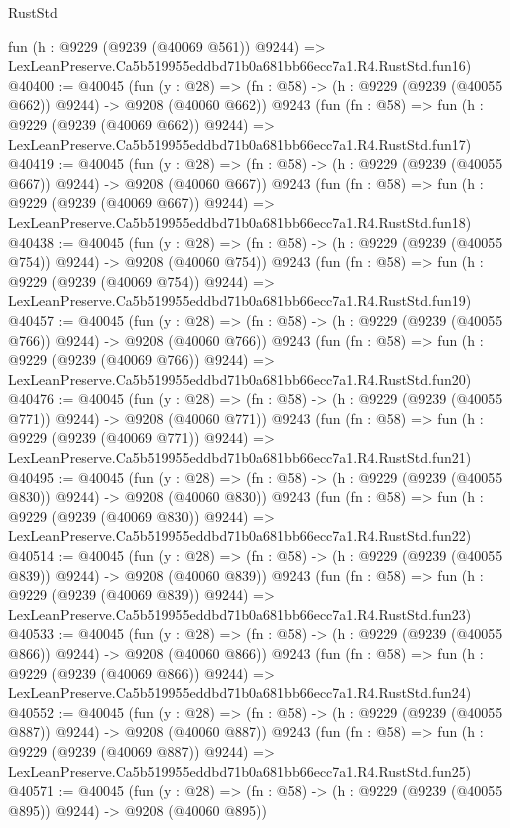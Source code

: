 \begin{lexlean}{RustStd}
\begin{coremodule}
    fun (h : @9229 (@9239 (@40069 @561)) @9244) =>
    LexLeanPreserve.Ca5b519955eddbd71b0a681bb66ecc7a1.R4.RustStd.fun16)
@40400 := @40045
    (fun (y : @28) => (fn : @58) -> (h : @9229 (@9239 (@40055 @662)) @9244) -> @9208 (@40060 @662))
    @9243
    (fun (fn : @58) =>
    fun (h : @9229 (@9239 (@40069 @662)) @9244) =>
    LexLeanPreserve.Ca5b519955eddbd71b0a681bb66ecc7a1.R4.RustStd.fun17)
@40419 := @40045
    (fun (y : @28) => (fn : @58) -> (h : @9229 (@9239 (@40055 @667)) @9244) -> @9208 (@40060 @667))
    @9243
    (fun (fn : @58) =>
    fun (h : @9229 (@9239 (@40069 @667)) @9244) =>
    LexLeanPreserve.Ca5b519955eddbd71b0a681bb66ecc7a1.R4.RustStd.fun18)
@40438 := @40045
    (fun (y : @28) => (fn : @58) -> (h : @9229 (@9239 (@40055 @754)) @9244) -> @9208 (@40060 @754))
    @9243
    (fun (fn : @58) =>
    fun (h : @9229 (@9239 (@40069 @754)) @9244) =>
    LexLeanPreserve.Ca5b519955eddbd71b0a681bb66ecc7a1.R4.RustStd.fun19)
@40457 := @40045
    (fun (y : @28) => (fn : @58) -> (h : @9229 (@9239 (@40055 @766)) @9244) -> @9208 (@40060 @766))
    @9243
    (fun (fn : @58) =>
    fun (h : @9229 (@9239 (@40069 @766)) @9244) =>
    LexLeanPreserve.Ca5b519955eddbd71b0a681bb66ecc7a1.R4.RustStd.fun20)
@40476 := @40045
    (fun (y : @28) => (fn : @58) -> (h : @9229 (@9239 (@40055 @771)) @9244) -> @9208 (@40060 @771))
    @9243
    (fun (fn : @58) =>
    fun (h : @9229 (@9239 (@40069 @771)) @9244) =>
    LexLeanPreserve.Ca5b519955eddbd71b0a681bb66ecc7a1.R4.RustStd.fun21)
@40495 := @40045
    (fun (y : @28) => (fn : @58) -> (h : @9229 (@9239 (@40055 @830)) @9244) -> @9208 (@40060 @830))
    @9243
    (fun (fn : @58) =>
    fun (h : @9229 (@9239 (@40069 @830)) @9244) =>
    LexLeanPreserve.Ca5b519955eddbd71b0a681bb66ecc7a1.R4.RustStd.fun22)
@40514 := @40045
    (fun (y : @28) => (fn : @58) -> (h : @9229 (@9239 (@40055 @839)) @9244) -> @9208 (@40060 @839))
    @9243
    (fun (fn : @58) =>
    fun (h : @9229 (@9239 (@40069 @839)) @9244) =>
    LexLeanPreserve.Ca5b519955eddbd71b0a681bb66ecc7a1.R4.RustStd.fun23)
@40533 := @40045
    (fun (y : @28) => (fn : @58) -> (h : @9229 (@9239 (@40055 @866)) @9244) -> @9208 (@40060 @866))
    @9243
    (fun (fn : @58) =>
    fun (h : @9229 (@9239 (@40069 @866)) @9244) =>
    LexLeanPreserve.Ca5b519955eddbd71b0a681bb66ecc7a1.R4.RustStd.fun24)
@40552 := @40045
    (fun (y : @28) => (fn : @58) -> (h : @9229 (@9239 (@40055 @887)) @9244) -> @9208 (@40060 @887))
    @9243
    (fun (fn : @58) =>
    fun (h : @9229 (@9239 (@40069 @887)) @9244) =>
    LexLeanPreserve.Ca5b519955eddbd71b0a681bb66ecc7a1.R4.RustStd.fun25)
@40571 := @40045
    (fun (y : @28) => (fn : @58) -> (h : @9229 (@9239 (@40055 @895)) @9244) -> @9208 (@40060 @895))

\end{coremodule}
\end{lexlean}
